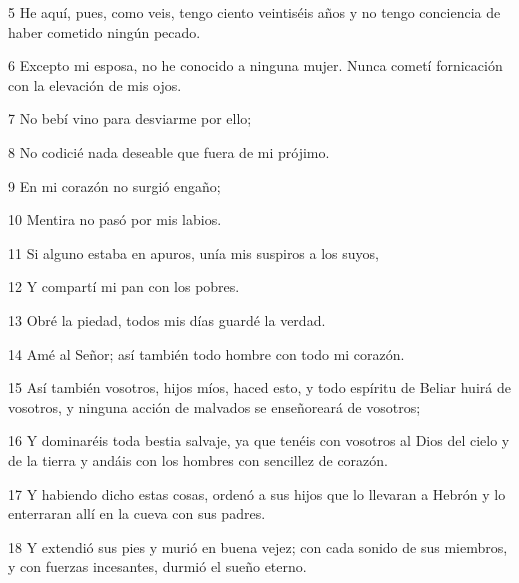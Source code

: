 \par 5 He aquí, pues, como veis, tengo ciento veintiséis años y no tengo conciencia de haber cometido ningún pecado.

\par 6 Excepto mi esposa, no he conocido a ninguna mujer. Nunca cometí fornicación con la elevación de mis ojos.

\par 7 No bebí vino para desviarme por ello;

\par 8 No codicié nada deseable que fuera de mi prójimo.

\par 9 En mi corazón no surgió engaño;

\par 10 Mentira no pasó por mis labios.

\par 11 Si alguno estaba en apuros, unía mis suspiros a los suyos,

\par 12 Y compartí mi pan con los pobres.

\par 13 Obré la piedad, todos mis días guardé la verdad.

\par 14 Amé al Señor; así también todo hombre con todo mi corazón.

\par 15 Así también vosotros, hijos míos, haced esto, y todo espíritu de Beliar huirá de vosotros, y ninguna acción de malvados se enseñoreará de vosotros;

\par 16 Y dominaréis toda bestia salvaje, ya que tenéis con vosotros al Dios del cielo y de la tierra y andáis con los hombres con sencillez de corazón.

\par 17 Y habiendo dicho estas cosas, ordenó a sus hijos que lo llevaran a Hebrón y lo enterraran allí en la cueva con sus padres.

\par 18 Y extendió sus pies y murió en buena vejez; con cada sonido de sus miembros, y con fuerzas incesantes, durmió el sueño eterno.



